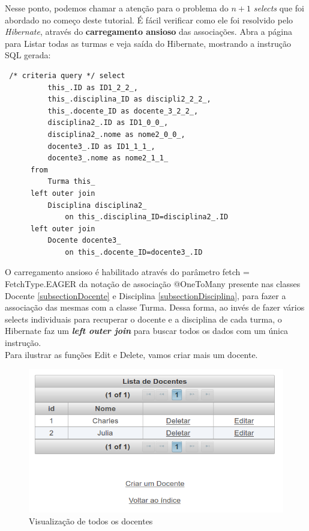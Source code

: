 \documentclass[12pt,a4paper]{article}
\begin{document}
Nesse ponto, podemos chamar a atenção para o problema do $n+1$ \textit{selects} que foi abordado no começo deste tutorial. É fácil verificar como ele foi resolvido pelo \textit{Hibernate}, através do \textbf{carregamento ansioso} das associações. Abra a página para Listar todas as turmas e veja saída do Hibernate, mostrando a instrução SQL gerada:
\lstset{language=SQL}
\begin{lstlisting}
 /* criteria query */ select
          this_.ID as ID1_2_2_,
          this_.disciplina_ID as discipli2_2_2_,
          this_.docente_ID as docente_3_2_2_,
          disciplina2_.ID as ID1_0_0_,
          disciplina2_.nome as nome2_0_0_,
          docente3_.ID as ID1_1_1_,
          docente3_.nome as nome2_1_1_ 
      from
          Turma this_ 
      left outer join
          Disciplina disciplina2_ 
              on this_.disciplina_ID=disciplina2_.ID 
      left outer join
          Docente docente3_ 
              on this_.docente_ID=docente3_.ID
\end{lstlisting}

O carregamento ansioso é habilitado através do parâmetro fetch = FetchType.EAGER da notação de associação @OneToMany presente nas classes Docente \ref{subsectionDocente} e Disciplina \ref{subsectionDisciplina}, para fazer a associação das mesmas com a classe Turma. Dessa forma, ao invés de fazer vários selects individuais para recuperar o docente e a disciplina de cada turma, o Hibernate faz um \textit{\textbf{left outer join}} para buscar todos os dados com um única instrução.\\


Para ilustrar as funções Edit e Delete, vamos criar mais um docente.

\begin{figure}[H]
    \centering
    \includegraphics[scale=0.45]{criarDocente2.png}
    \caption{Visualização de todos os docentes}
    \label{criarDocente2}
\end{figure}
\end{document}
